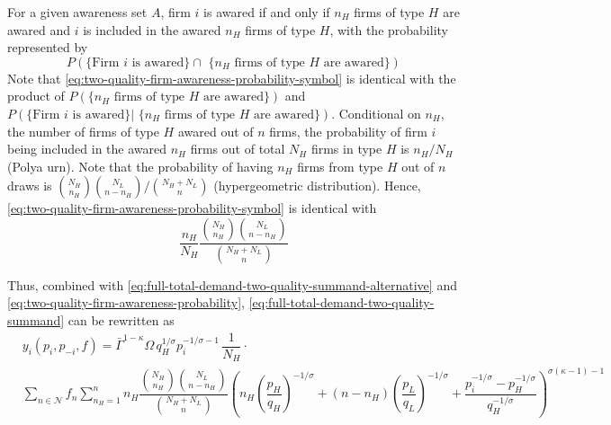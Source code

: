 \documentclass[12pt]{article}
\begin{document}
For a given awareness set $A$, firm $i$ is awared if and only if $n_H$ firms of type $H$ are awared and $i$ is included in the awared $n_H$ firms of type $H$, with the probability represented by
\begin{equation}\label{eq:two-quality-firm-awareness-probability-symbol}
P( \text{\{Firm $i$ is awared\} $\cap$ \{$n_H$ firms of type $H$ are awared\}})
\end{equation}
Note that \eqref{eq:two-quality-firm-awareness-probability-symbol} is identical with the product of $P( \text{\{$n_H$ firms of type $H$ are awared\}})$ and  $P( \text{\{Firm $i$ is awared\} | \{$n_H$ firms of type $H$ are awared\}})$. Conditional on $n_H$, the number of firms of type $H$ awared out of $n$ firms, the probability of firm $i$ being included in the awared $n_H$ firms out of total $N_H$ firms in type $H$ is $n_H / N_H$ (Polya urn). Note that the probability of having $n_H$ firms from type $H$ out of $n$ draws is $\binom{N_H}{n_H} \binom{N_L}{n - n_H} / \binom{N_H + N_L}{n}$ (hypergeometric distribution). Hence, \eqref{eq:two-quality-firm-awareness-probability-symbol} is identical with
\begin{equation}\label{eq:two-quality-firm-awareness-probability}
\dfrac{n_H}{N_H}
\dfrac{\binom{N_H}{n_H} \binom{N_L}{n - n_H}}{\binom{N_H + N_L}{n}} 
\end{equation}

Thus, combined with \eqref{eq:full-total-demand-two-quality-summand-alternative} and \eqref{eq:two-quality-firm-awareness-probability},  \eqref{eq:full-total-demand-two-quality-summand} can be rewritten as
\begin{equation}\label{eq:full-total-demand-two-quality-alternative}
\begin{aligned}
& y_{i}(p_i, p_{-i}, f) 
=  \bar{\Gamma}^{1-\kappa}\Omega \, q_H^{1/\sigma}p_i^{-1/\sigma - 1}\, \dfrac{1}{N_H} \cdot \\ 
&\sum_{n \in \mathcal{N} } f_n   \sum_{n_H =1}^n  
n_H \dfrac{\binom{N_H}{n_H} \binom{N_L}{n - n_H}}{\binom{N_H + N_L}{n}}
\left( 
n_H \left( \dfrac{p_{H}}{q_{H}}   \right)^{-1/\sigma} +  
(n - n_H) \left( \dfrac{p_{L}}{q_{L}}   \right)^{-1/\sigma} +
\dfrac{p_i^{-1/\sigma} - p^{-1/\sigma}_{H} }{ q_H^{-1/\sigma }} 
\right)^{\sigma (\kappa - 1)-1}
\end{aligned}
\end{equation}
\end{document}
